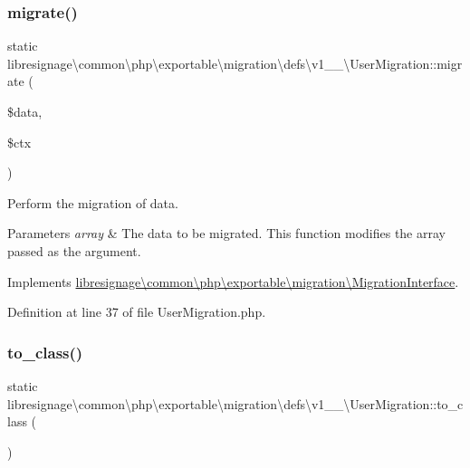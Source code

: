 \subsubsection{\texorpdfstring{migrate()}{migrate()}}
{\footnotesize\ttfamily static libresignage\textbackslash{}common\textbackslash{}php\textbackslash{}exportable\textbackslash{}migration\textbackslash{}defs\textbackslash{}v1\+\_\+\_\textbackslash{}\+User\+Migration\+::migrate (\begin{DoxyParamCaption}\item[{array \&}]{\$data,  }\item[{\hyperlink{classlibresignage_1_1common_1_1php_1_1exportable_1_1ExportableDataContext}{Exportable\+Data\+Context}}]{\$ctx }\end{DoxyParamCaption})\hspace{0.3cm}{\ttfamily [static]}}

Perform the migration of data.


\begin{DoxyParams}{Parameters}
{\em array} & The data to be migrated. This function modifies the array passed as the argument. \\
\hline
\end{DoxyParams}


Implements \hyperlink{interfacelibresignage_1_1common_1_1php_1_1exportable_1_1migration_1_1MigrationInterface_a8275bfe14f59f19bb3b33b239fd48c5d}{libresignage\textbackslash{}common\textbackslash{}php\textbackslash{}exportable\textbackslash{}migration\textbackslash{}\+Migration\+Interface}.



Definition at line 37 of file User\+Migration.\+php.

\mbox{\label{classlibresignage_1_1common_1_1php_1_1exportable_1_1migration_1_1defs_1_1v1__0__0_1_1UserMigration_ab2641b8685911589dde7ab064f00b7d4}} 
\subsubsection{\texorpdfstring{to\+\_\+class()}{to\_class()}}
{\footnotesize\ttfamily static libresignage\textbackslash{}common\textbackslash{}php\textbackslash{}exportable\textbackslash{}migration\textbackslash{}defs\textbackslash{}v1\+\_\+\_\textbackslash{}\+User\+Migration\+::to\+\_\+class (\begin{DoxyParamCaption}{ }\end{DoxyParamCaption})\hspace{0.3cm}{\ttfamily [static]}}

